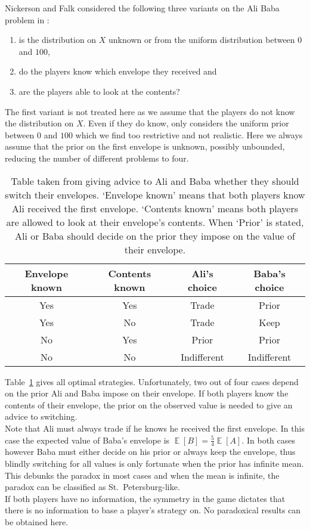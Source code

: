 \documentclass[a4paper]{report}
\theoremstyle{plain}
\theoremstyle{definition}
\theoremstyle{remark}
\numberwithin{equation}{chapter}
\DeclareMathOperator{\E}{\mathbb{E}}
\DeclareMathOperator{\1}{\mathbbm{1}}
\begin{document}
Nickerson and Falk considered the following three variants on the Ali Baba problem in \cite{Nickerson06}:
\begin{enumerate}
\item is the distribution on $X$ unknown or from the uniform distribution between $0$ and $100$,
\item do the players know which envelope they received and
\item are the players able to look at the contents?
\end{enumerate}
The first variant is not treated here as we assume that the players do not know the distribution on $X$. Even if they do know, \cite{Nickerson06} only considers the uniform prior between $0$ and $100$ which we find too restrictive and not realistic. Here we always assume that the prior on the first envelope is unknown, possibly unbounded, reducing the number of different problems to four.

\begin{table}
\centering
\begin{tabular}{cc|cc}
Envelope known&Contents known&Ali's choice&Baba's choice\\\hline
Yes&Yes&Trade&Prior\\
Yes&No&Trade&Keep\\
No&Yes&Prior&Prior\\
No&No&Indifferent&Indifferent
\end{tabular}

\caption{Table taken from \cite{Nickerson06} giving advice to Ali and Baba whether they should switch their envelopes. `Envelope known' means that both players know Ali received the first envelope. `Contents known' means both players are allowed to look at their envelope's contents. When `Prior' is stated, Ali or Baba should decide on the prior they impose on the value of their envelope.}
\label{tbl:alibaba}
\end{table}

Table~\ref{tbl:alibaba} gives all optimal strategies. Unfortunately, two out of four cases depend on the prior Ali and Baba impose on their envelope. If both players know the contents of their envelope, the prior on the observed value is needed to give an advice to switching.\\
Note that Ali must always trade if he knows he received the first envelope. In this case the expected value of Baba's envelope is $\E[B]=\frac{5}{4}\E[A]$. In both cases however Baba must either decide on his prior or always keep the envelope, thus blindly switching for all values is only fortunate when the prior has infinite mean. This debunks the paradox in most cases and when the mean is infinite, the paradox can be classified as St.~Petersburg-like.\\
If both players have no information, the symmetry in the game dictates that there is no information to base a player's strategy on. No paradoxical results can be obtained here.
\end{document}
